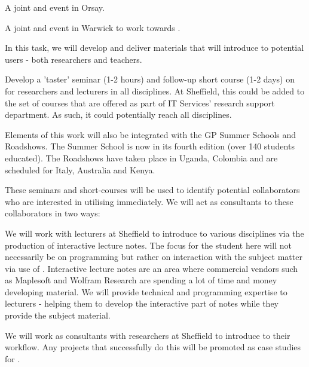 \begin{workpackage}
\begin{tasklist}
\begin{task}[title=Community building: development workshops, lead=PS]
\begin{compactitem}
\item A joint \Jupyter and \Sage event in Orsay.

\item A joint \LMFDB and \Sage event in Warwick to work towards .


\end{compactitem}


\end{task}

\begin{task}[title=Introduce \TheProject to researchers and teachers]


In this task, we will develop and deliver materials that will introduce \TheProject to potential users - both researchers and teachers.

Develop a 'taster' seminar (1-2 hours) and follow-up short course (1-2 days) on \TheProject for researchers and lecturers in all disciplines. At Sheffield, this could be added to the set of courses that are offered as part of IT Services' research support department. As such, it could potentially reach all disciplines.

Elements of this work will also be integrated with the GP Summer Schools and Roadshows. The Summer School is now in its fourth edition (over 140 students educated). The Roadshows have taken place in Uganda, Colombia and are scheduled for Italy, Australia and Kenya.

These seminars and short-courses will be used to identify potential collaborators who are interested in utilising \TheProject immediately. We will act as consultants to these collaborators in two ways:

We will work with lecturers at Sheffield to introduce \TheProject to various disciplines via the production of interactive lecture notes. The focus for the student here will not necessarily be on programming but rather on interaction with the subject matter via use of \TheProject. Interactive lecture notes are an area where commercial vendors such as Maplesoft and Wolfram Research are spending a lot of time and money developing material. We will provide technical and programming expertise to lecturers - helping them to develop the interactive part of notes while they provide the subject material.

We will work as consultants with researchers at Sheffield to introduce \TheProject to their workflow. Any projects that successfully do this will be promoted as case studies for \TheProject.
\end{task}


\end{tasklist}
\end{workpackage}
